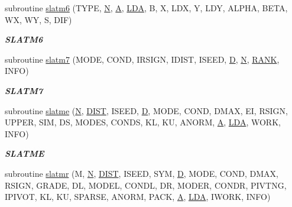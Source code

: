 \begin{DoxyCompactItemize}
subroutine \hyperlink{group__real__matgen_ga06fa660302fdc1f35f0ce2bc876cc528}{slatm6} (T\+Y\+P\+E, \hyperlink{polmisc_8c_a0240ac851181b84ac374872dc5434ee4}{N}, \hyperlink{classA}{A}, \hyperlink{example__user_8c_ae946da542ce0db94dced19b2ecefd1aa}{L\+D\+A}, B, X, L\+D\+X, Y, L\+D\+Y, A\+L\+P\+H\+A, B\+E\+T\+A, W\+X, W\+Y, S, D\+I\+F)
\begin{DoxyCompactList}\small\item\em {\bfseries S\+L\+A\+T\+M6} \end{DoxyCompactList}\item 
subroutine \hyperlink{group__real__matgen_ga0e590a52ca23b003f19a4c4375e07e5c}{slatm7} (M\+O\+D\+E, C\+O\+N\+D, I\+R\+S\+I\+G\+N, I\+D\+I\+S\+T, I\+S\+E\+E\+D, \hyperlink{odrpack_8h_a7dae6ea403d00f3687f24a874e67d139}{D}, \hyperlink{polmisc_8c_a0240ac851181b84ac374872dc5434ee4}{N}, \hyperlink{splinemodule_8c_a3a88bcc63386de30443dacede2e01847}{R\+A\+N\+K}, I\+N\+F\+O)
\begin{DoxyCompactList}\small\item\em {\bfseries S\+L\+A\+T\+M7} \end{DoxyCompactList}\item 
subroutine \hyperlink{group__real__matgen_gab7855e56a909a6453a7cf0f7078843af}{slatme} (\hyperlink{polmisc_8c_a0240ac851181b84ac374872dc5434ee4}{N}, \hyperlink{superlu__enum__consts_8h_af00a42ecad444bbda75cde1b64bd7e72ac04fbbdf0d80a4ad25e565541deeebd7}{D\+I\+S\+T}, I\+S\+E\+E\+D, \hyperlink{odrpack_8h_a7dae6ea403d00f3687f24a874e67d139}{D}, M\+O\+D\+E, C\+O\+N\+D, D\+M\+A\+X, E\+I, R\+S\+I\+G\+N, U\+P\+P\+E\+R, S\+I\+M, D\+S, M\+O\+D\+E\+S, C\+O\+N\+D\+S, K\+L, K\+U, A\+N\+O\+R\+M, \hyperlink{classA}{A}, \hyperlink{example__user_8c_ae946da542ce0db94dced19b2ecefd1aa}{L\+D\+A}, W\+O\+R\+K, I\+N\+F\+O)
\begin{DoxyCompactList}\small\item\em {\bfseries S\+L\+A\+T\+M\+E} \end{DoxyCompactList}\item 
subroutine \hyperlink{group__real__matgen_gab8833c811131e57b4132c9735ba80693}{slatmr} (M, \hyperlink{polmisc_8c_a0240ac851181b84ac374872dc5434ee4}{N}, \hyperlink{superlu__enum__consts_8h_af00a42ecad444bbda75cde1b64bd7e72ac04fbbdf0d80a4ad25e565541deeebd7}{D\+I\+S\+T}, I\+S\+E\+E\+D, S\+Y\+M, \hyperlink{odrpack_8h_a7dae6ea403d00f3687f24a874e67d139}{D}, M\+O\+D\+E, C\+O\+N\+D, D\+M\+A\+X, R\+S\+I\+G\+N, G\+R\+A\+D\+E, D\+L, M\+O\+D\+E\+L, C\+O\+N\+D\+L, D\+R, M\+O\+D\+E\+R, C\+O\+N\+D\+R, P\+I\+V\+T\+N\+G, I\+P\+I\+V\+O\+T, K\+L, K\+U, S\+P\+A\+R\+S\+E, A\+N\+O\+R\+M, P\+A\+C\+K, \hyperlink{classA}{A}, \hyperlink{example__user_8c_ae946da542ce0db94dced19b2ecefd1aa}{L\+D\+A}, I\+W\+O\+R\+K, I\+N\+F\+O)

\end{DoxyCompactItemize}

